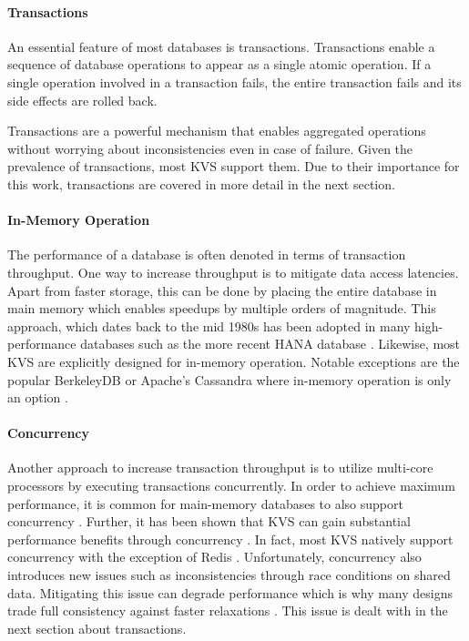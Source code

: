 \paragraph{Transactions}

An essential feature of most databases is transactions. Transactions enable a
sequence of database operations to appear as a single atomic operation. If a
single operation involved in a transaction fails, the entire transaction fails and its side effects are rolled back.

Transactions are a powerful mechanism that enables aggregated operations without
worrying about inconsistencies even in case of failure. Given the prevalence of
transactions, most KVS support them. Due to their importance for this work,
transactions are covered in more detail in the next section.

\paragraph{In-Memory Operation}

The performance of a database is often denoted in terms of transaction
throughput. One way to increase throughput is to mitigate data access latencies.
Apart from faster storage, this can be done by placing the entire database in
main memory which enables speedups by multiple orders of magnitude. This
approach, which dates back to the mid 1980s has been adopted in many
high-performance databases such as the more recent HANA database
\cite{molina1992main, faerber2012hana}. Likewise, most KVS are explicitly
designed for in-memory operation. Notable exceptions are the popular BerkeleyDB
or Apache's Cassandra where in-memory operation is only an option
\cite{bdb2017doc, lakshman2010cassandra}.

\paragraph{Concurrency}

Another approach to increase transaction throughput is to utilize multi-core
processors by executing transactions concurrently. In order to achieve maximum
performance, it is common for main-memory databases to also support concurrency
\cite{grund2010hyrise, faerber2012hana, diaconu2013hekaton}. Further, it has
been shown that KVS can gain substantial performance benefits through
concurrency \cite{fan2013memc3, li2015architecting, xu2014building}. In fact,
most KVS natively support concurrency with the exception of Redis
\cite{redis2017home}. Unfortunately, concurrency also introduces new issues such
as inconsistencies through race conditions on shared data. Mitigating this issue
can degrade performance which is why many designs trade full consistency against
faster relaxations \cite{decandia2007dynamo}. This issue is dealt with in the
next section about transactions.

